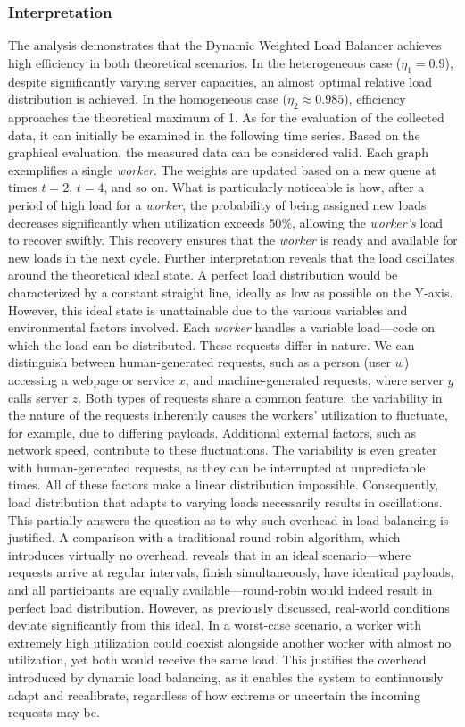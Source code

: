 \documentclass[twocolumn]{webofc}
\begin{document}
    \subsubsection{Interpretation}
    The analysis demonstrates that the Dynamic Weighted Load Balancer achieves high efficiency in both theoretical scenarios. In the heterogeneous case (\(\eta_1 = 0.9\)), despite significantly varying server capacities, an almost optimal relative load distribution is achieved. In the homogeneous case (\(\eta_2 \approx 0.985\)), efficiency approaches the theoretical maximum of 1. As for the evaluation of the collected data, it can initially be examined in the following time series. Based on the graphical evaluation, the measured data can be considered valid. Each graph exemplifies a single \textit{worker}. The weights are updated based on a new queue at times \(t=2\), \(t=4\), and so on. What is particularly noticeable is how, after a period of high load for a \textit{worker}, the probability of being assigned new loads decreases significantly when utilization exceeds \(50\%\), allowing the \textit{worker's} load to recover swiftly. This recovery ensures that the \textit{worker} is ready and available for new loads in the next cycle. Further interpretation reveals that the load oscillates around the theoretical ideal state. A perfect load distribution would be characterized by a constant straight line, ideally as low as possible on the Y-axis. However, this ideal state is unattainable due to the various variables and environmental factors involved. Each \textit{worker} handles a variable load—code on which the load can be distributed. These requests differ in nature. We can distinguish between human-generated requests, such as a person (user \(w\)) accessing a webpage or service \(x\), and machine-generated requests, where server \(y\) calls server \(z\). Both types of requests share a common feature: the variability in the nature of the requests inherently causes the workers' utilization to fluctuate, for example, due to differing payloads. Additional external factors, such as network speed, contribute to these fluctuations. The variability is even greater with human-generated requests, as they can be interrupted at unpredictable times. All of these factors make a linear distribution impossible. Consequently, load distribution that adapts to varying loads necessarily results in oscillations. This partially answers the question as to why such overhead in load balancing is justified. A comparison with a traditional round-robin algorithm, which introduces virtually no overhead\cite{arpaci-dusseau2014operating}, reveals that in an ideal scenario—where requests arrive at regular intervals, finish simultaneously, have identical payloads, and all participants are equally available—round-robin would indeed result in perfect load distribution. However, as previously discussed, real-world conditions deviate significantly from this ideal. In a worst-case scenario, a worker with extremely high utilization could coexist alongside another worker with almost no utilization, yet both would receive the same load. This justifies the overhead introduced by dynamic load balancing, as it enables the system to continuously adapt and recalibrate, regardless of how extreme or uncertain the incoming requests may be.
\end{document}
